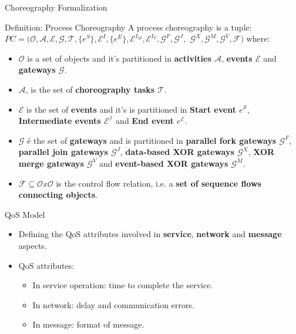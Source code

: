 \documentclass[xcolor=svgnames]{beamer}
\begin{document}
  \begin{frame}{Choreography Formalization}
    \begin{block}{ Definition: Process Choreography }\vspace{-.3\baselineskip}
      A process choreography  is a tuple: 
            \textbf{ $PC = (\mathcal{O, A, E, G, T}, \{e^S\}, \mathcal{E}^I, \{e^E\}, \mathcal{E}^{I_M}, \mathcal{E}^{I_T}, \mathcal{G}^F, \mathcal{G}^J,$
       $\mathcal{G}^X, \mathcal{G}^M, \mathcal{G}^V, \mathcal{F} )$} where:
      
      \begin{itemize}
	  \item \textbf{$\mathcal{O}$} is a set of objects and it's partitioned in \textbf{activities $\mathcal{A}$}, \textbf{events $\mathcal{E}$} and \textbf{gateways $\mathcal{G}$}.
	  \item \textbf{$\mathcal{A}$}, is the set of \textbf{choreography tasks $\mathcal{T}$}.
	  \item \textbf{$\mathcal{E}$} is the set of \textbf{events} and  it's is partitioned in \textbf{Start event {$e^\mathcal{S}$}}, \textbf{Intermediate
	events $\mathcal{E^I}$} and \textbf{End event {$e^\mathcal{E}$}}.
	  \item \textbf{$\mathcal{G}$} é the set of \textbf{gateways} and is partitioned in \textbf{parallel fork gateways $\mathcal{G}^F$},
	\textbf{parallel join gateways $\mathcal{G}^J$}, \textbf{data-based XOR gateways $\mathcal{G}^X$}, \textbf{XOR merge gateways $\mathcal{G}^V$} and \textbf{event-based
	XOR gateways $\mathcal{G}^M$}.
	\item \textbf{$\mathcal{F} \subseteq \mathcal{O}x\mathcal{O}$} is the control flow relation, i.e. a \textbf{set of sequence flows connecting objects}.
      \end{itemize}
      
    \end{block}

  \end{frame}

  
  \begin{frame}{QoS Model}
    \begin{itemize} %
	\item Defining the QoS attributes involved in \textbf{service}, \textbf{network} and \textbf{message} aspects.
	\item QoS attributes:
	    \begin{itemize}
	      \item In service operation: time to complete the service.
	      \item In network: delay and communication errors. 
	      \item In message: format of message.
	    \end{itemize}
    \end{itemize}
  \end{frame}
\end{document}
